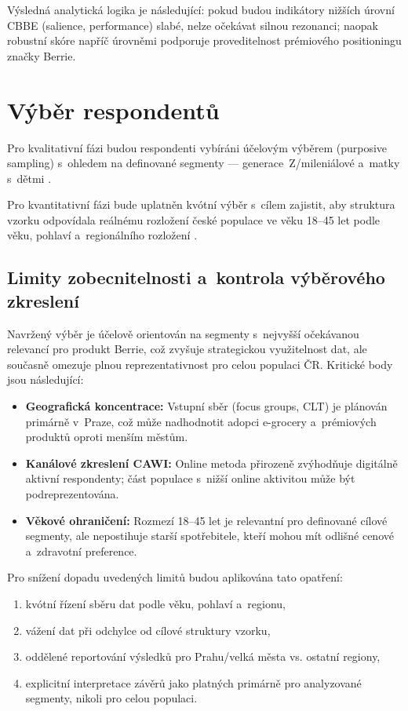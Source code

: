 Výsledná analytická logika je následující: pokud budou indikátory nižších úrovní CBBE (salience, performance) slabé, nelze očekávat silnou rezonanci; naopak robustní skóre napříč úrovněmi podporuje proveditelnost prémiového positioningu značky Berrie.

\section{Výběr respondentů}
\label{sec:meth_sampling}

Pro kvalitativní fázi budou respondenti vybíráni účelovým výběrem (purposive sampling) s~ohledem na definované segmenty — generace~Z/mileniálové a~matky s~dětmi \parencite{morgan_1997}.

Pro kvantitativní fázi bude uplatněn kvótní výběr s~cílem zajistit, aby struktura vzorku odpovídala reálnému rozložení české populace ve věku 18--45 let podle věku, pohlaví a~regionálního rozložení \parencite{czso_spotreba_2024}.

\subsection{Limity zobecnitelnosti a~kontrola výběrového zkreslení}
\label{subsec:meth_sampling_limits}

Navržený výběr je účelově orientován na segmenty s~nejvyšší očekávanou relevancí pro produkt Berrie, což zvyšuje strategickou využitelnost dat, ale současně omezuje plnou reprezentativnost pro celou populaci ČR. Kritické body jsou následující:
\begin{itemize}
  \item \textbf{Geografická koncentrace:} Vstupní sběr (focus groups, CLT) je plánován primárně v~Praze, což může nadhodnotit adopci e-grocery a~prémiových produktů oproti menším městům.
  \item \textbf{Kanálové zkreslení CAWI:} Online metoda přirozeně zvýhodňuje digitálně aktivní respondenty; část populace s~nižší online aktivitou může být podreprezentována.
  \item \textbf{Věkové ohraničení:} Rozmezí 18--45 let je relevantní pro definované cílové segmenty, ale nepostihuje starší spotřebitele, kteří mohou mít odlišné cenové a~zdravotní preference.
\end{itemize}

Pro snížení dopadu uvedených limitů budou aplikována tato opatření:
\begin{enumerate}
  \item kvótní řízení sběru dat podle věku, pohlaví a~regionu,
  \item vážení dat při odchylce od cílové struktury vzorku,
  \item oddělené reportování výsledků pro Prahu/velká města vs. ostatní regiony,
  \item explicitní interpretace závěrů jako platných primárně pro analyzované segmenty, nikoli pro celou populaci.
\end{enumerate}

